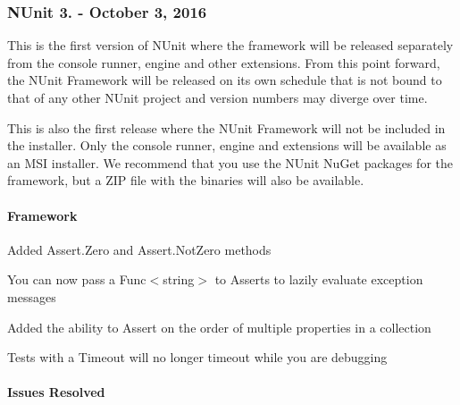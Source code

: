 \subsubsection*{N\+Unit 3. -\/ October 3, 2016}

This is the first version of N\+Unit where the framework will be released separately from the console runner, engine and other extensions. From this point forward, the N\+Unit Framework will be released on its own schedule that is not bound to that of any other N\+Unit project and version numbers may diverge over time.

This is also the first release where the N\+Unit Framework will not be included in the installer. Only the console runner, engine and extensions will be available as an M\+SI installer. We recommend that you use the N\+Unit Nu\+Get packages for the framework, but a Z\+IP file with the binaries will also be available.

\paragraph*{Framework}


\begin{DoxyItemize}
\item Added Assert.\+Zero and Assert.\+Not\+Zero methods
\item You can now pass a {\ttfamily Func$<$string$>$} to Asserts to lazily evaluate exception messages
\item Added the ability to Assert on the order of multiple properties in a collection
\item Tests with a Timeout will no longer timeout while you are debugging
\end{DoxyItemize}

\paragraph*{Issues Resolved}


